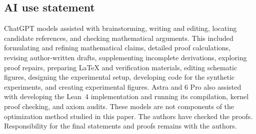 \subsection*{AI use statement}
ChatGPT models assisted with brainstorming, writing and editing, locating
candidate references, and checking mathematical arguments. This included
formulating and refining mathematical claims, detailed proof calculations,
revising author-written drafts, supplementing incomplete derivations,
exploring proof repairs, preparing LaTeX and verification materials,
editing schematic figures, designing the experimental setup,
developing code for the synthetic experiments, and creating experimental
figures. Astra and 6 Pro also assisted with developing the Lean~4 implementation
and running its compilation, kernel proof checking, and axiom audits.
These models are not components of the
optimization method studied in this paper. The authors have checked the proofs.
Responsibility for the final
statements and proofs remains with the authors.
